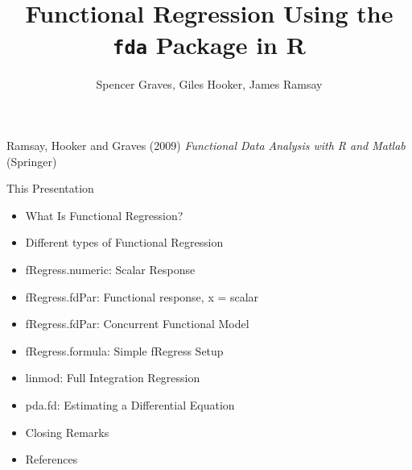 \documentclass[compress]{beamer}
\begin{document}

\title{
Functional Regression \newline
Using the \texttt{fda} Package in R}
\author{Spencer Graves, Giles Hooker, James Ramsay}

\date{}

\begin{frame}

\maketitle

Ramsay, Hooker and Graves (2009)
\emph{Functional Data Analysis with R and Matlab}
(Springer)

\end{frame}

\begin{frame}{This Presentation}

\begin{itemize}
\item What Is Functional Regression?

\item Different types of Functional Regression

\item fRegress.numeric:  Scalar Response

\item fRegress.fdPar:  Functional response, x = scalar

\item fRegress.fdPar:  Concurrent Functional Model

\item fRegress.formula:  Simple fRegress Setup

\item linmod:  Full Integration Regression

\item pda.fd:  Estimating a Differential Equation

\item Closing Remarks

\item References

\end{itemize}

\end{frame}
\end{document}
